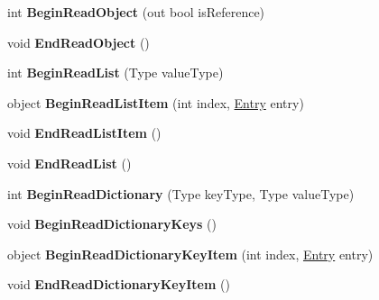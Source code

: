 \begin{DoxyCompactItemize}
int {\bfseries Begin\+Read\+Object} (out bool is\+Reference)
\item 
\mbox{\label{interface_serialization_1_1_i_storage_af7f518486ceab2b980b6b90a16b33a97}} 
void {\bfseries End\+Read\+Object} ()
\item 
\mbox{\label{interface_serialization_1_1_i_storage_afe6be681d819bbfd7db4078f29230020}} 
int {\bfseries Begin\+Read\+List} (Type value\+Type)
\item 
\mbox{\label{interface_serialization_1_1_i_storage_abfe338de53a6322dbd3832d426ae49a4}} 
object {\bfseries Begin\+Read\+List\+Item} (int index, \hyperlink{class_serialization_1_1_entry}{Entry} entry)
\item 
\mbox{\label{interface_serialization_1_1_i_storage_a8308151ce64440db9ac2c385e3b96d45}} 
void {\bfseries End\+Read\+List\+Item} ()
\item 
\mbox{\label{interface_serialization_1_1_i_storage_a2349911c359017baa76773f203b33ee5}} 
void {\bfseries End\+Read\+List} ()
\item 
\mbox{\label{interface_serialization_1_1_i_storage_a57c3bee701eba61b73c8ea69f29d3ca3}} 
int {\bfseries Begin\+Read\+Dictionary} (Type key\+Type, Type value\+Type)
\item 
\mbox{\label{interface_serialization_1_1_i_storage_ae44889714fb24b498bae004a9e6890ee}} 
void {\bfseries Begin\+Read\+Dictionary\+Keys} ()
\item 
\mbox{\label{interface_serialization_1_1_i_storage_a3739c13259528b0042e3e150357638a2}} 
object {\bfseries Begin\+Read\+Dictionary\+Key\+Item} (int index, \hyperlink{class_serialization_1_1_entry}{Entry} entry)
\item 
\mbox{\label{interface_serialization_1_1_i_storage_afdfcddaf43f8c474af85a0667541f785}} 
void {\bfseries End\+Read\+Dictionary\+Key\+Item} ()

\end{DoxyCompactItemize}
